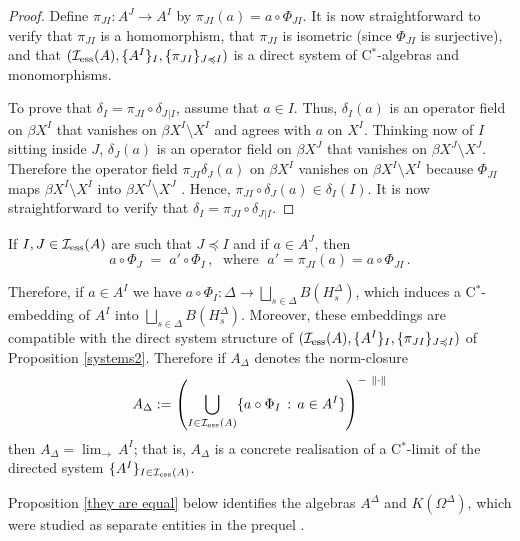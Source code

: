 \documentclass{amsart}
\theoremstyle{definition}
\theoremstyle{remark}
\begin{document}
\begin{proof}
Define $\pi_{JI}:A^J\rightarrow A^I$ by $\pi_{JI}(a)=a\circ\Phi_{JI}$. It is now straightforward to verify that $\pi_{JI}$ is a homomorphism,
that $\pi_{JI}$ is isometric (since $\Phi_{JI}$ is surjective),
and that  $( \mathcal I_{\rm ess}(A), \{A^I\}_{I}, \{\pi_{JI}\}_{J \preccurlyeq I})$ is a direct system
of C$^*$-algebras and monomorphisms.

To prove that $\delta_I=\pi_{JI}\circ\delta_J{}_{\vert I}$, assume that $a\in I$. Thus, $\delta_I(a)$ is an operator field on $\beta X^I$
that vanishes on $\beta X^I\setminus X^I$ and agrees with $a$ on $X^I$. Thinking now of $I$ sitting inside $J$,
$\delta_J(a)$ is an operator field on $\beta X^J$ that vanishes on $\beta X^J\setminus X^J$.
Therefore the operator field $\pi_{JI}\delta_J(a)$ on $\beta X^I$ vanishes on $\beta X^I\setminus X^I$
because
$\Phi_{JI}$ maps $\beta X^I\setminus X^I$ into $\beta X^J\setminus X^J$ \cite[Theorem 6.12]{Gillman-Jerison-book}.
Hence, $\pi_{JI}\circ\delta_J(a)\in\delta_I(I)$. It is now straightforward to verify that  $\delta_I=\pi_{JI}\circ\delta_J{}_{\vert I}$.
\end{proof}

 If $I,J\in \mathcal I_{\rm ess}(A)$  are such that  $J\preccurlyeq I$ and if $a\in A^J$,
then
\begin{equation}\label{notation2}
a\circ\Phi_J\;=\;a'\circ\Phi_I\,,\;\mbox{ where }\;a'=\pi_{JI}(a)=a\circ\Phi_{JI}\,.
\end{equation}

 Therefore, if $a\in A^I$ we have $a\circ \Phi_I:\Delta\rightarrow \bigsqcup_{s\in\Delta}B(H_s^\Delta)$, which induces a C$^*$-embedding of $A^I$ into  $\bigsqcup_{s\in\Delta}B(H_s^\Delta)$. Moreover, these embeddings are compatible with the direct system structure of $(\mathcal I_{\rm ess}(A), \{A^I\}_{I}, \{\pi_{JI}\}_{J \preccurlyeq I})$ of Proposition \ref{systems2}. Therefore
 if $A_\Delta$ denotes the norm-closure  $$A_\Delta:=\left(\displaystyle\bigcup_{I\in \mathcal I_{\rm ess}(A)}\{a\circ\Phi_I\,:\,a\in A^I\}\right)^{-\ \|\cdot\|}$$ then $A_\Delta=\lim_{\rightarrow}\,A^I$; that is, $A_\Delta$ is a concrete realisation of a C$^*$-limit of the directed system $\{A^I\}_{I\in \mathcal I_{\rm ess}(A)}$.

 

Proposition \ref{they are equal} below identifies the algebras $A^\Delta$ and $K(\Omega^\Delta)$, which were studied as separate
entities in the prequel \cite{argerami--farenick--massey2010}.
 
\end{document}
